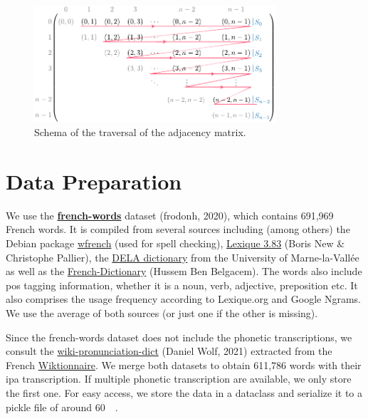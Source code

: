 \begin{figure}
    \centering
    \includegraphics[width=0.8\textwidth]{assets/illustrator/traverse-schema.pdf}
    \caption{Schema of the traversal of the adjacency matrix.}
    \label{fig:traverse-schema}
\end{figure}

\section{Data Preparation}
\label{sec:data}

We use the \href{https://github.com/frodonh/french-words}{\textbf{french-words}} dataset (frodonh, 2020), which contains 691,969 French words. It is compiled from several sources including (among others) the Debian package \href{https://packages.debian.org/fr/sid/wfrench}{wfrench} (used for spell checking), \href{http://www.lexique.org/}{Lexique 3.83} (Boris New \& Christophe Pallier), the \href{https://infolingu.univ-mlv.fr/DonneesLinguistiques/Dictionnaires/telechargement.html}{DELA dictionary} from the University of Marne-la-Vallée as well as the \href{https://github.com/hbenbel/French-Dictionary}{French-Dictionary} (Hussem Ben Belgacem). The words also include \acrfull{pos} tagging information, \eg whether it is a noun, verb, adjective, preposition etc. It also comprises the usage frequency according to Lexique.org and Google Ngrams. We use the average of both sources (or just one if the other is missing).

Since the french-words dataset does not include the phonetic transcriptions, we consult the \href{https://github.com/DanielSWolf/wiki-pronunciation-dict}{wiki-pronunciation-dict} (Daniel Wolf, 2021) extracted from the French \href{https://fr.wiktionary.org/}{Wiktionnaire}. We merge both datasets to obtain 611,786 words with their \gls{ipa} transcription. If multiple phonetic transcription are available, we only store the first one. For easy access, we store the data in a dataclass and serialize it to a pickle file of around \qty{60}{\mega\byte}.

